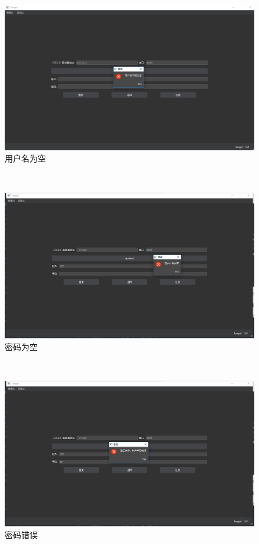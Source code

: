 \documentclass[UTF8]{ctexart}
\begin{document}
\begin{figure}[!ht]
    \centering
    \includegraphics[scale=0.3]{./images/userempty.png}
    \caption{用户名为空}
\end{figure}\\
\begin{figure}[!ht]
    \centering
    \includegraphics[scale=0.3]{./images/pawdempty.png}
    \caption{密码为空}
\end{figure}\\
\newpage
\begin{figure}[!ht]
    \centering
    \includegraphics[scale=0.3]{./images/wrong_password.png}
    \caption{密码错误}
\end{figure}\ \\
\end{document}
